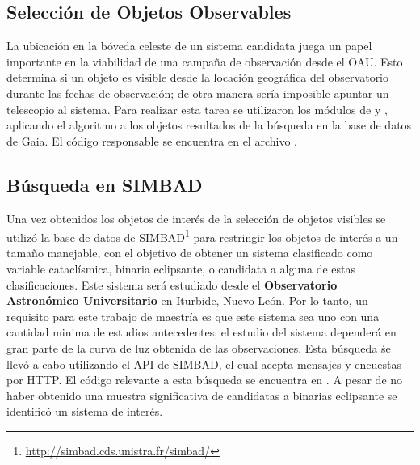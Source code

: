 \subsection{Selección de Objetos Observables} \label{muestra:crit_seleccion:objetos_observables}

La ubicación en la bóveda celeste de un sistema candidata juega un papel
importante en la viabilidad de una campaña de observación desde el OAU. Esto
determina si un objeto es visible desde la locación geográfica del observatorio
durante las fechas de observación; de otra manera sería imposible apuntar un
telescopio al sistema. Para realizar esta tarea se utilizaron los módulos de
 \citet{astroplan} y  \citet{astropy}, aplicando
el algoritmo a los objetos resultados de la búsqueda en la base de datos de
Gaia. El código responsable se encuentra en el archivo
\href{https://github.com/KnightIV/UANL_MAPTA_Observaciones/blob/main/obsrv_plan/gaia/observable_targets.py}{}.


\subsection{Búsqueda en SIMBAD} \label{muestra:crit_seleccion:busqueda_simbad}

Una vez obtenidos los objetos de interés de la selección de objetos visibles se
utilizó la base de datos de
SIMBAD\footnote{\url{http://simbad.cds.unistra.fr/simbad/}} para restringir los
objetos de interés a un tamaño manejable, con el objetivo de obtener un sistema
clasificado como variable cataclísmica, binaria eclipsante, o candidata a alguna
de estas clasificaciones. Este sistema será estudiado desde el
\textbf{Observatorio Astronómico Universitario} en Iturbide, Nuevo León. Por lo
tanto, un requisito para este trabajo de maestría es que este sistema sea uno
con una cantidad minima de estudios antecedentes; el estudio del sistema
dependerá en gran parte de la curva de luz obtenida de las observaciones. Esta
búsqueda śe llevó a cabo utilizando el API de SIMBAD, el cual acepta mensajes y
encuestas por HTTP. El código relevante a esta búsqueda se encuentra en
\href{https://github.com/KnightIV/UANL_MAPTA_Observaciones/blob/main/obsrv_plan/simbad/retrieve_vots.py}{}.
A pesar de no haber obtenido una muestra significativa de candidatas a binarias
eclipsante se identificó un sistema de interés.

